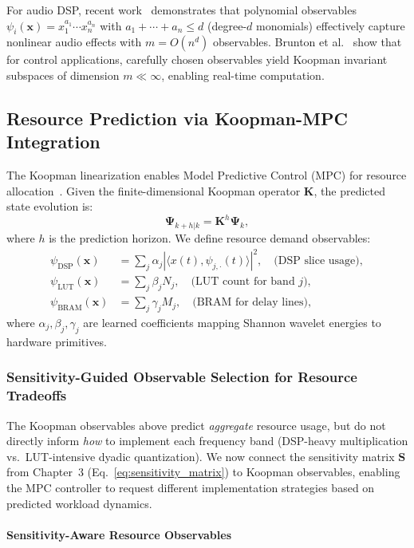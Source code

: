 For audio DSP, recent work~\cite{Huhtala2024} demonstrates that polynomial observables $\psi_i(\mathbf{x}) = x_1^{a_1} \cdots x_n^{a_n}$ with $a_1 + \cdots + a_n \leq d$ (degree-$d$ monomials) effectively capture nonlinear audio effects with $m = O(n^d)$ observables. Brunton et al.~\cite{Brunton2016} show that for control applications, carefully chosen observables yield Koopman invariant subspaces of dimension $m \ll \infty$, enabling real-time computation.

\subsection{Resource Prediction via Koopman-MPC Integration}

The Koopman linearization enables Model Predictive Control (MPC) for resource allocation~\cite{Korda2018}. Given the finite-dimensional Koopman operator $\mathbf{K}$, the predicted state evolution is:
\[
\mathbf{\Psi}_{k+h|k} = \mathbf{K}^h \mathbf{\Psi}_k,
\]
where $h$ is the prediction horizon. We define resource demand observables:
\begin{align}
\psi_{\text{DSP}}(\mathbf{x}) &= \sum_{j} \alpha_j |\langle x(t), \psi_{j,\cdot}(t) \rangle|^2, \quad \text{(DSP slice usage)},\\
\psi_{\text{LUT}}(\mathbf{x}) &= \sum_{j} \beta_j N_j, \quad \text{(LUT count for band $j$)},\\
\psi_{\text{BRAM}}(\mathbf{x}) &= \sum_{j} \gamma_j M_j, \quad \text{(BRAM for delay lines)},
\end{align}
where $\alpha_j, \beta_j, \gamma_j$ are learned coefficients mapping Shannon wavelet energies to hardware primitives.

\subsubsection{Sensitivity-Guided Observable Selection for Resource Tradeoffs}

The Koopman observables above predict \emph{aggregate} resource usage, but do not directly inform \emph{how} to implement each frequency band (DSP-heavy multiplication vs.\ LUT-intensive dyadic quantization). We now connect the sensitivity matrix $\mathbf{S}$ from Chapter~3 (Eq.~\ref{eq:sensitivity_matrix}) to Koopman observables, enabling the MPC controller to request different implementation strategies based on predicted workload dynamics.

\paragraph{Sensitivity-Aware Resource Observables}


